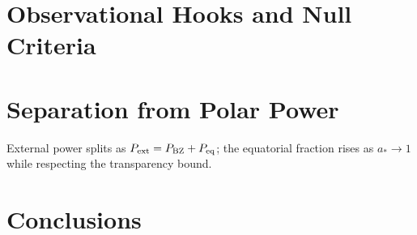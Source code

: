 \documentclass[twocolumn]{aastex701}
\begin{document}
\section{Observational Hooks and Null Criteria}

\section{Separation from Polar Power}
External power splits as $P_{\rm ext}=P_{\rm BZ}+P_{\rm eq}$; the equatorial fraction rises as $a_*\to1$ while respecting the transparency bound.

\section{Conclusions}


\acknowledgments


\end{document}
